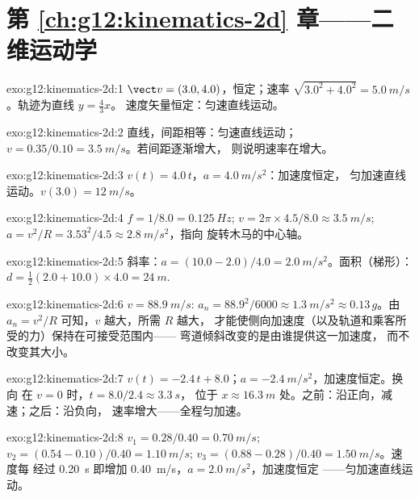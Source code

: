 \section*{第 \ref{ch:g12:kinematics-2d} 章——二维运动学}

\begin{solution}{exo:g12:kinematics-2d:1}
$\vect v = (3.0, 4.0)$，恒定；速率 $\sqrt{3.0^2 + 4.0^2} =
\qty{5.0}{m/s}$。轨迹为直线 $y = \tfrac43 x$。
速度矢量恒定：匀速直线运动。
\end{solution}

\begin{solution}{exo:g12:kinematics-2d:2}
直线，间距相等：匀速直线运动；
$v = 0.35/0.10 = \qty{3.5}{m/s}$。若间距逐渐增大，
则说明速率在增大。
\end{solution}

\begin{solution}{exo:g12:kinematics-2d:3}
$v(t) = 4.0\,t$，$a = \qty{4.0}{m/s^2}$：加速度恒定，
匀加速直线运动。$v(3.0) = \qty{12}{m/s}$。
\end{solution}

\begin{solution}{exo:g12:kinematics-2d:4}
$f = 1/8.0 = \qty{0.125}{Hz}$;
$v = 2\pi \times 4.5/8.0 \approx \qty{3.5}{m/s}$;
$a = v^2/R = 3.53^2/4.5 \approx \qty{2.8}{m/s^2}$，指向
旋转木马的中心轴。
\end{solution}

\begin{solution}{exo:g12:kinematics-2d:5}
斜率：$a = (10.0 - 2.0)/4.0 = \qty{2.0}{m/s^2}$。面积（梯形）：
$d = \tfrac12 (2.0 + 10.0) \times 4.0 = \qty{24}{m}$.
\end{solution}

\begin{solution}{exo:g12:kinematics-2d:6}
$v = \qty{88.9}{m/s}$: $a_n = 88.9^2/6000 \approx \qty{1.3}{m/s^2}
\approx 0.13\,g$。由 $a_n = v^2/R$ 可知，$v$ 越大，所需 $R$ 越大，
才能使侧向加速度（以及轨道和乘客所受的力）保持在可接受范围内——
弯道倾斜改变的是由谁提供这一加速度，
而不改变其大小。
\end{solution}

\begin{solution}{exo:g12:kinematics-2d:7}
$v(t) = -2.4\,t + 8.0$；$a = \qty{-2.4}{m/s^2}$，加速度恒定。换向
在 $v = 0$ 时，$t = 8.0/2.4 \approx \qty{3.3}{s}$，
位于 $x \approx \qty{16.3}{m}$ 处。之前：沿正向，减速；之后：沿负向，
速率增大——全程匀加速。
\end{solution}

\begin{solution}{exo:g12:kinematics-2d:8}
$v_1 = 0.28/0.40 = \qty{0.70}{m/s}$;
$v_2 = (0.54 - 0.10)/0.40 = \qty{1.10}{m/s}$;
$v_3 = (0.88 - 0.28)/0.40 = \qty{1.50}{m/s}$。速度每
经过 \qty{0.20}{s} 即增加 \qty{0.40}{m/s}，$a = \qty{2.0}{m/s^2}$，加速度恒定
——匀加速直线运动。
\end{solution}

